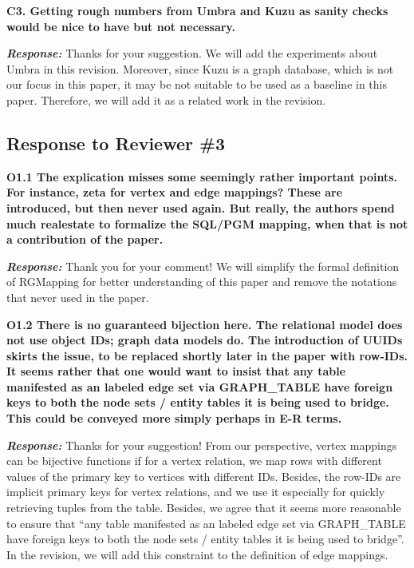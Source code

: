 \textbf{
C3. Getting rough numbers from Umbra and Kuzu as sanity checks would be nice to have but not necessary.}

\textbf{\textit{Response: }}
Thanks for your suggestion. We will add the experiments about Umbra in this revision. Moreover, since Kuzu is a graph database, which is not our focus in this paper, it may be not suitable to be used as a baseline in this paper. Therefore, we will add it as a related work in the revision.


\subsection{Response to Reviewer \#3}

\textbf{
O1.1 The explication misses some seemingly rather important points.
For instance, zeta for vertex and edge mappings? These are introduced, but then never used again. But really, the authors spend much realestate to formalize the SQL/PGM mapping, when that is not a contribution of the paper.}

\textbf{\textit{Response: }}
Thank you for your comment! We will simplify the formal definition of RGMapping for better understanding of this paper and remove the notations that never used in the paper.


\textbf{
O1.2 There is no guaranteed bijection here. The relational model does not use object IDs; graph data models do. The introduction of UUIDs skirts the issue, to be replaced shortly later in the paper with row-IDs. It seems rather that one would want to insist that any table manifested as an labeled edge set via GRAPH\_TABLE have foreign keys to both the node sets / entity tables it is being used to bridge. This could be conveyed more simply perhaps in E-R terms.}

\textbf{\textit{Response: }}
Thanks for your suggestion! From our perspective, vertex mappings can be bijective functions if for a vertex relation, we map rows with different values of the primary key to vertices with different IDs. Besides, the row-IDs are implicit primary keys for vertex relations, and we use it especially for quickly retrieving tuples from the table. Besides, we agree that it seems more reasonable to ensure that ``any table manifested as an labeled edge set via GRAPH\_TABLE have foreign keys to both the node sets / entity tables it is being used to bridge''. In the revision, we will add this constraint to the definition of edge mappings.


